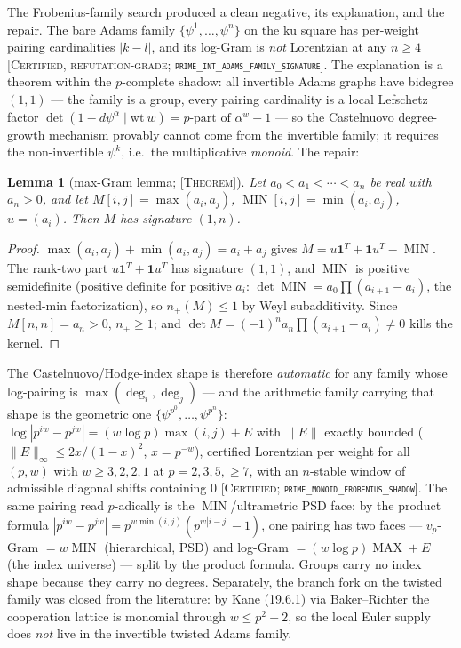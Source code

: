 \documentclass[11pt,reqno]{amsart}
\theoremstyle{plain}
\newtheorem{lemma}[theorem]{Lemma}
\theoremstyle{definition}
\theoremstyle{remark}
\newcommand{\ku}{\mathrm{ku}}
\newcommand{\grade}[1]{\textup{[\textsc{#1}]}}
\DeclareMathOperator{\MAX}{MAX}
\DeclareMathOperator{\MIN}{MIN}
\begin{document}
The Frobenius-family search produced a clean negative, its explanation, and the repair. The
bare Adams family $\{\psi^1, \dots, \psi^n\}$ on the $\ku$ square has per-weight pairing
cardinalities $|k - l|$, and its log-Gram is \emph{not} Lorentzian at any $n \ge 4$
\grade{Certified, refutation-grade; \texttt{prime\_\allowbreak int\_\allowbreak adams\_\allowbreak family\_\allowbreak signature}}. The
explanation is a theorem within the $p$-complete shadow: all invertible Adams graphs have
bidegree $(1,1)$ --- the family is a group, every pairing cardinality is a local Lefschetz
factor $\det(1 - d\psi^\alpha \mid \mathrm{wt}\ w) = p\text{-part of } \alpha^w - 1$ --- so
the Castelnuovo degree-growth mechanism provably cannot come from the invertible family; it
requires the non-invertible $\psi^k$, i.e.\ the multiplicative \emph{monoid}. The repair:

\begin{lemma}[max-Gram lemma; \grade{Theorem}]\label{lem:maxgram}
Let $a_0 < a_1 < \cdots < a_n$ be real with $a_n > 0$, and let
$M[i,j] = \max(a_i, a_j)$, $\MIN[i,j] = \min(a_i, a_j)$, $u = (a_i)$. Then $M$ has
signature $(1, n)$.
\end{lemma}

\begin{proof}
$\max(a_i,a_j) + \min(a_i,a_j) = a_i + a_j$ gives
$M = u\mathbf{1}^{T} + \mathbf{1}u^{T} - \MIN$. The rank-two part
$u\mathbf{1}^T + \mathbf{1}u^T$ has signature $(1,1)$, and $\MIN$ is positive semidefinite
(positive definite for positive $a_i$: $\det\MIN = a_0\prod(a_{i+1} - a_i)$, the nested-min
factorization), so $n_+(M) \le 1$ by Weyl subadditivity. Since $M[n,n] = a_n > 0$,
$n_+ \ge 1$; and $\det M = (-1)^n a_n \prod(a_{i+1} - a_i) \ne 0$ kills the kernel.
\end{proof}

The Castelnuovo/Hodge-index shape is therefore \emph{automatic} for any family whose
log-pairing is $\max(\deg_i, \deg_j)$ --- and the arithmetic family carrying that shape is
the geometric one $\{\psi^{p^0}, \dots, \psi^{p^n}\}$:
$\log|p^{iw} - p^{jw}| = (w\log p)\max(i,j) + E$ with $\|E\|$ exactly bounded
($\|E\|_\infty \le 2x/(1-x)^2$, $x = p^{-w}$), certified Lorentzian per weight for all
$(p, w)$ with $w \ge 3, 2, 2, 1$ at $p = 2, 3, 5, \ge 7$, with an $n$-stable window of
admissible diagonal shifts containing $0$
\grade{Certified; \texttt{prime\_\allowbreak monoid\_\allowbreak frobenius\_\allowbreak shadow}}. The same pairing read
$p$-adically is the $\MIN$/ultrametric PSD face: by the product formula
$|p^{iw} - p^{jw}| = p^{w\min(i,j)}(p^{w|i-j|} - 1)$, one pairing has two faces ---
$v_p$-Gram $= w\MIN$ (hierarchical, PSD) and log-Gram $= (w\log p)\MAX + E$ (the index
universe) --- split by the product formula. Groups carry no index shape because they carry
no degrees. Separately, the branch fork on the twisted family was closed from the
literature: by Kane (19.6.1) \cite{Kane81} via Baker--Richter \cite{BakerRichter05} the
cooperation lattice is monomial through $w \le p^2 - 2$, so the local Euler supply does
\emph{not} live in the invertible twisted Adams family.
\end{document}
